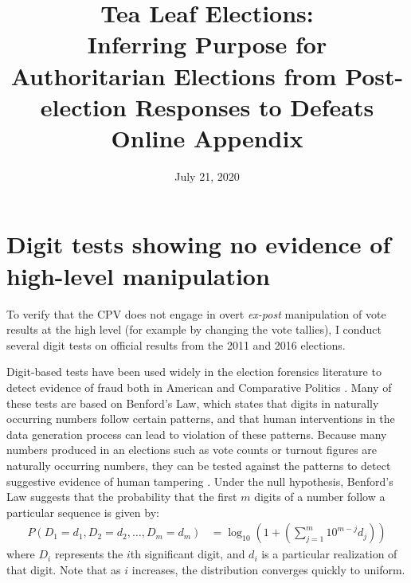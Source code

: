 \documentclass[12pt]{article}
\title{Tea Leaf Elections: \\
	Inferring Purpose for Authoritarian Elections from Post-election Responses to Defeats \\
	\vspace{2ex}
	Online Appendix}
\date{July 21, 2020}
\newcommand{\1}{\mathbbm{1}}
\renewcommand\r{\right}
\renewcommand\l{\left}
\begin{document}
	

\maketitle
\thispagestyle{empty}


\doublespacing

\newpage
{}

\tableofcontents
\newpage

\appendix

\section{Digit tests showing no evidence of high-level manipulation}
\label{app:benford}
To verify that the CPV does not engage in overt \textit{ex-post} manipulation of vote results at the high level (for example by changing the vote tallies), I conduct several digit tests on official results from the 2011 and 2016 elections. 

Digit-based tests have been used widely in the election forensics literature to detect evidence of fraud both in American \citep{Mebane2006} and Comparative Politics \citep{Mebane2009, Beber2012}. Many of these tests are based on Benford's Law, which states that digits in naturally occurring numbers follow certain patterns, and that human interventions in the data generation process can lead to violation of these patterns. Because many numbers produced in an elections such as vote counts or turnout figures are naturally occurring numbers, they can be tested against the patterns to detect suggestive evidence of human tampering \citep{Mebane2006}. Under the null hypothesis, Benford's Law suggests that the probability that the first $m$ digits of a number follow a particular sequence is given by:
\begin{align*}
P(D_1=d_1, D_2=d_2, \dots, D_m=d_m) &= \log_{10}\l(1 + \l( \sum_{j=1}^{m}10^{m-j}d_j\r)\r)
\end{align*}
where $D_i$ represents the $i$th significant digit, and $d_i$ is a particular realization of that digit. 
Note that as $i$ increases, the distribution converges quickly to uniform.
\end{document}

